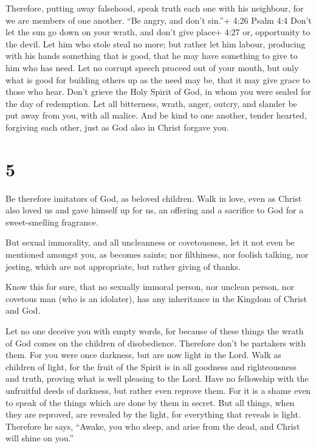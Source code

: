  Therefore, putting away falsehood, speak truth each one
with his neighbour, for we are members of one another. 
``Be angry, and don't sin.''+ 4:26 Psalm 4:4 Don't let the sun go down
on your wrath,  and don't give place+ 4:27 or, opportunity
to the devil.  Let him who stole steal no more; but rather
let him labour, producing with his hands something that is good, that he
may have something to give to him who has need.  Let no
corrupt speech proceed out of your mouth, but only what is good for
building others up as the need may be, that it may give grace to those
who hear.  Don't grieve the Holy Spirit of God, in whom you
were sealed for the day of redemption.  Let all bitterness,
wrath, anger, outcry, and slander be put away from you, with all malice.
 And be kind to one another, tender hearted, forgiving each
other, just as God also in Christ forgave you.

\hypertarget{section-4}{%
\section{5}\label{section-4}}

 Be therefore imitators of God, as beloved children.
 Walk in love, even as Christ also loved us and gave himself
up for us, an offering and a sacrifice to God for a sweet-smelling
fragrance.

 But sexual immorality, and all uncleanness or covetousness,
let it not even be mentioned amongst you, as becomes saints;
 nor filthiness, nor foolish talking, nor jesting, which are
not appropriate, but rather giving of thanks.

 Know this for sure, that no sexually immoral person, nor
unclean person, nor covetous man (who is an idolater), has any
inheritance in the Kingdom of Christ and God.

 Let no one deceive you with empty words, for because of
these things the wrath of God comes on the children of disobedience.
 Therefore don't be partakers with them.  For
you were once darkness, but are now light in the Lord. Walk as children
of light,  for the fruit of the Spirit is in all goodness
and righteousness and truth,  proving what is well pleasing
to the Lord.  Have no fellowship with the unfruitful deeds
of darkness, but rather even reprove them.  For it is a
shame even to speak of the things which are done by them in secret.
 But all things, when they are reproved, are revealed by
the light, for everything that reveals is light.  Therefore
he says, ``Awake, you who sleep, and arise from the dead, and Christ
will shine on you.''

